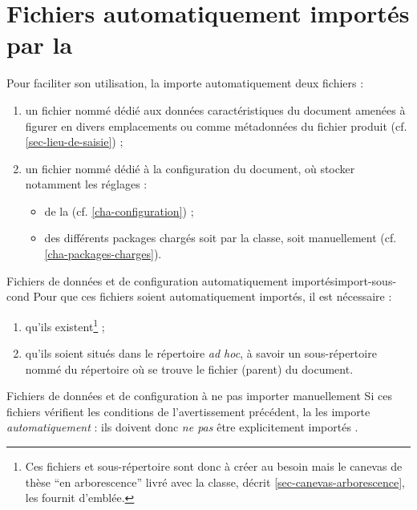 \chapter{Fichiers automatiquement importés par la \yatCl{}}
\label{cha-fichiers-importes-par}

Pour faciliter son utilisation, la \yatCl{} importe automatiquement deux
fichiers :
\begin{enumerate}
\item%
  un fichier nommé \file{\characteristicsfile} dédié aux données
  caractéristiques du document amenées à figurer en divers emplacements ou comme
  métadonnées du fichier \pdf{} produit (cf. \vref{sec-lieu-de-saisie}) ;
\item%
  un fichier nommé \file{\configurationfile} dédié à la configuration du
  document, où stocker notamment les réglages :
  \begin{itemize}
  \item de la \yatCl{} (cf. \vref{cha-configuration}) ;
  \item des différents packages chargés soit par la classe, soit manuellement
    (cf. \vref{cha-packages-charges}).
  \end{itemize}
\end{enumerate}
\begin{dbwarning}{Fichiers de données et de configuration automatiquement importés}{import-sous-cond}
  Pour que ces fichiers
  soient automatiquement importés, il est nécessaire :
  \begin{enumerate}
  \item qu'ils existent\footnote{Ces fichiers et sous-répertoire sont donc
      à créer au besoin mais le canevas de thèse \enquote{en arborescence} livré avec
      la classe, décrit \vref{sec-canevas-arborescence}, les fournit d'emblée.} ;
  \item%
    qu'ils soient situés dans le répertoire \emph{ad hoc}, à savoir un
    sous-répertoire nommé \folder{\configurationdirectory} du répertoire où se
    trouve le fichier (parent) du document.
  \end{enumerate}
\end{dbwarning}
%
\begin{dbwarning}{Fichiers de données et de configuration à ne pas importer manuellement}{}
  Si ces fichiers
  vérifient les conditions de l'avertissement précédent, la \yatCl{} les
  importe \emph{automatiquement} : ils doivent donc \emph{ne pas} être
  explicitement importés .
\end{dbwarning}
